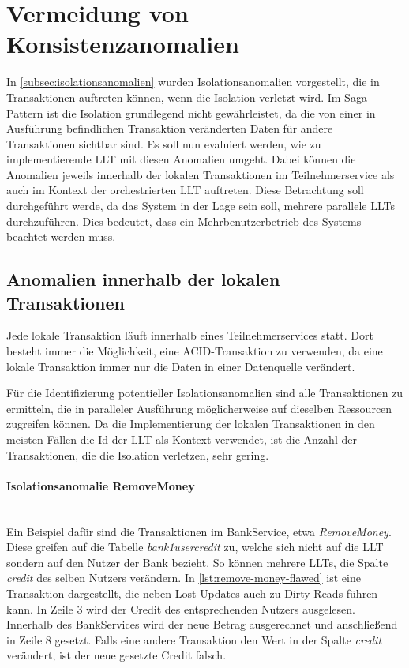 \section{Vermeidung von Konsistenzanomalien}
In \cref{subsec:isolationsanomalien} wurden Isolationsanomalien vorgestellt, die in Transaktionen auftreten können, wenn die Isolation verletzt wird. Im Saga-Pattern ist die Isolation grundlegend nicht gewährleistet, da die von einer in Ausführung befindlichen Transaktion veränderten Daten für andere Transaktionen sichtbar sind. Es soll nun evaluiert werden, wie zu implementierende LLT mit diesen Anomalien umgeht. Dabei können die Anomalien jeweils innerhalb der lokalen Transaktionen im Teilnehmerservice als auch im Kontext der orchestrierten LLT auftreten. Diese Betrachtung soll durchgeführt werde, da das System in der Lage sein soll, mehrere parallele LLTs durchzuführen. Dies bedeutet, dass ein Mehrbenutzerbetrieb des Systems beachtet werden muss.

\subsection{Anomalien innerhalb der lokalen Transaktionen}
Jede lokale Transaktion läuft innerhalb eines Teilnehmerservices statt. Dort besteht immer die Möglichkeit, eine ACID-Transaktion zu verwenden, da eine lokale Transaktion immer nur die Daten in einer Datenquelle verändert. 

Für die Identifizierung potentieller Isolationsanomalien sind alle Transaktionen zu ermitteln, die in paralleler Ausführung möglicherweise auf dieselben Ressourcen zugreifen können. Da die Implementierung der lokalen Transaktionen in den meisten Fällen die Id der LLT als Kontext verwendet, ist die Anzahl der Transaktionen, die die Isolation verletzen, sehr gering. 

\paragraph*{Isolationsanomalie RemoveMoney} \mbox{} \\
Ein Beispiel dafür sind die Transaktionen im BankService, etwa \textit{RemoveMoney}. Diese greifen auf die Tabelle \textit{bank1usercredit} zu, welche sich nicht auf die LLT sondern auf den Nutzer der Bank bezieht. So können mehrere LLTs, die Spalte \textit{credit} des selben Nutzers verändern. In \cref{lst:remove-money-flawed} ist eine Transaktion dargestellt, die neben Lost Updates auch zu Dirty Reads führen kann. In Zeile 3 wird der Credit des entsprechenden Nutzers ausgelesen. Innerhalb des BankServices wird der neue Betrag ausgerechnet und anschließend in Zeile 8 gesetzt. Falls eine andere Transaktion den Wert in der Spalte \textit{credit} verändert, ist der neue gesetzte Credit falsch. 

